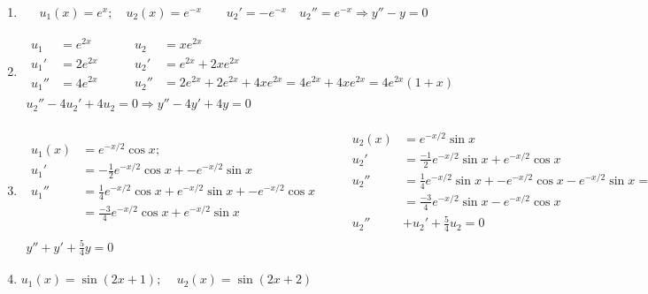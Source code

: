 \documentclass[twoside]{amsart}
\theoremstyle{plain}
\theoremstyle{definition}
\newcommand{\exercisehead}[1]
  {\smallskip
   \noindent{\small\bf Exercise #1.}}
\begin{document}
\exercisehead{20} 
\begin{enumerate}
\item 
\[
u_1(x) = e^x ; \quad u_2(x) = e^{-x} \quad \quad u_2' = -e^{-x} \quad u_2'' = e^{-x} \Longrightarrow y'' - y =0
\] 
\item 
\[
\begin{gathered}
\begin{aligned}
u_1 & = e^{2x} \\
u_1' & = 2 e^{2x} \\
u_1'' & = 4 e^{2x} 
\end{aligned} \quad \quad \,
\begin{aligned}
u_2 & = xe^{2x} \\
u_2' & = e^{2x} + 2 x e^{2x} \\
u_2'' & = 2e^{2x} + 2e^{2x} + 4 x e^{2x} = 4 e^{2x} + 4 x e^{2x} = 4 e^{2x} ( 1 + x) 
\end{aligned} \\
u_2'' - 4 u_2' +4 u_2 =0 \Longrightarrow \boxed{ y'' - 4 y' +4 y = 0 }
\end{gathered}
\]
\item
\[
\begin{gathered}
\begin{aligned} u_1(x) & = e^{-x/2} \cos{x}; \\
  u_1' & = - \frac{1}{2} e^{-x/2} \cos{x} + -e^{-x/2} \sin{x} \\
  u_1'' & = \frac{1}{4} e^{-x/2} \cos{x} + e^{-x/2} \sin{x} + - e^{-x/2} \cos{x} \\
  & = \frac{-3}{4} e^{-x/2} \cos{x} + e^{-x/2} \sin{x}
\end{aligned} \quad \quad \, 
\begin{aligned}
  u_2(x) & = e^{-x/2} \sin{x} \\
  u_2' & = \frac{-1}{2} e^{-x/2} \sin{x} + e^{-x/2} \cos{x} \\
  u_2'' & = \frac{1}{4} e^{-x/2} \sin{x} + - e^{-x/2} \cos{x} - e^{-x/2} \sin{x} = \\
  & = \frac{-3}{4} e^{-x/2} \sin{x} - e^{-x/2} \cos{x} \\
  u_2'' &  + u_2' + \frac{5}{4} u_2 = 0 
\end{aligned} \\
\boxed{ y'' + y' + \frac{5}{4} y = 0 }
\end{gathered}
\]
\item $u_1(x) = \sin{ (2x+ 1) }; \quad \, u_2(x) = \sin{( 2x+2) }$   
\[
\begin{gathered}
\begin{aligned}

\end{aligned}
\end{gathered}\]
\end{enumerate}
\end{document}
